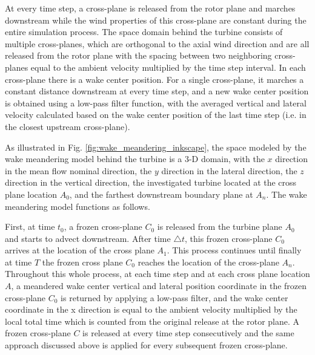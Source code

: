 \documentclass{umthesis}
\begin{document}
At every time step, a cross-plane is released from the rotor plane and marches downstream while the wind properties of this cross-plane are constant during the entire simulation process. The space domain behind the turbine consists of multiple cross-planes, which are orthogonal to the axial wind direction and are all released from the rotor plane with the spacing between two neighboring cross-planes equal to the ambient velocity multiplied by the time step interval. In each cross-plane there is a wake center position. For a single cross-plane, it marches a constant distance downstream at every time step, and a new wake center position is obtained using a low-pass filter function, with the averaged vertical and lateral velocity calculated based on the wake center position of the last time step (i.e. in the closest upstream cross-plane).

As illustrated in Fig. \ref{fig:wake_meandering_inkscape}, the space modeled by the wake meandering model behind the turbine is a 3-D domain, with the $x$ direction in the mean flow nominal direction, the $y$ direction in the lateral direction, the $z$ direction in the vertical direction, the investigated turbine located at the cross plane location $A_0$, and the farthest downstream boundary plane at $A_n$. The wake meandering model functions as follows.

First, at time $t_0$, a frozen cross-plane $C_0$ is released from the turbine plane $A_0$ and starts to advect downstream. After time $\triangle t$, this frozen cross-plane $C_0$ arrives at the location of the cross plane $A_1$. This process continues until finally at time $T$ the frozen cross plane $C_0$ reaches the location of the cross-plane $A_n$. Throughout this whole process, at each time step and at each cross plane location $A$, a meandered wake center vertical and lateral position coordinate in the frozen cross-plane $C_0$ is returned by applying a low-pass filter, and the wake center coordinate in the x direction is equal to the ambient velocity multiplied by the local total time which is counted from the original release at the rotor plane. A frozen cross-plane $C$ is released at every time step consecutively and the same approach discussed above is applied for every subsequent frozen cross-plane.
\end{document}
